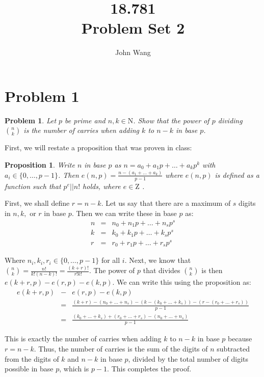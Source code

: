 \documentclass[psamsfonts]{amsart}
\title{18.781 \\
Problem Set 2}
\author{John Wang}
\newtheorem{prob}{Problem}[section]
\newtheorem{prop}[thm]{Proposition}
\newenvironment{sol}{{\bfseries Solution}}{\qedsymbol}
\theoremstyle{definition}
\theoremstyle{remark}
\numberwithin{equation}{section}
\begin{document}
\maketitle

\section{Problem 1}

\begin{prob}
Let $p$ be prime and $n,k \in \mathrm{N}$. Show that the power of $p$ dividing ${ n \choose k}$ is the number of carries when adding $k$ to $n - k$ in base $p$.
\end{prob}

\begin{sol}
First, we will restate a proposition that was proven in class:
\begin{prop}
Write $n$ in base $p$ as $n = a_0 + a_1 p + \ldots + a_k p^k$ with $a_i \in \{0, \ldots, p-1\}$. Then $e(n,p) = \frac{n - (a_1 + \ldots + a_k)}{p - 1}$ where $e(n,p)$ is defined as a function such that $p^e || n!$ holds, where $e \in \mathrm{Z}$ . 
\end{prop}

First, we shall define $r = n - k$. Let us say that there are a maximum of $s$ digits in $n,k,$ or $r$ in base $p$. Then we can write these in base $p$ as:
\begin{eqnarray}
n &=& n_0 + n_1 p + \ldots + n_s p^s \\
k &=& k_0 + k_1 p + \ldots + k_s p^s \\
r &=& r_0 + r_1 p + \ldots +  r_s p^s
\end{eqnarray} 

Where $n_i, k_i, r_i \in \{0, \ldots, p-1 \}$ for all $i$. Next, we know that ${n \choose k} = \frac{n!}{k! (n - k)!} = \frac{(k + r)!}{r! k!}$. The power of $p$ that divides ${n \choose k}$ is then $e(k+r, p) - e(r, p) - e(k, p)$. We can write this using the proposition as:
\begin{eqnarray}
e(k+r, p) &-& e(r, p) - e(k,p) \\
&=& \frac{(k+r) - (n_0 + \ldots + n_s) - (k - (k_0 + \ldots + k_s)) - (r - (r_0 + \ldots + r_s))}{p-1} \\
&=& \frac{(k_0 + \ldots + k_s) + (r_0 + \ldots + r_s) - (n_0 + \ldots + n_s)}{p-1}
\end{eqnarray}

This is exactly the number of carries when adding $k$ to $n - k$ in base $p$ because $r = n - k$. Thus, the number of carries is the sum of the digits of $n$ subtracted from the digits of $k$ and $n - k$ in base $p$, divided by the total number of digits possible in base $p$, which is $p - 1$. This completes the proof.
\end{sol}
\end{document}
